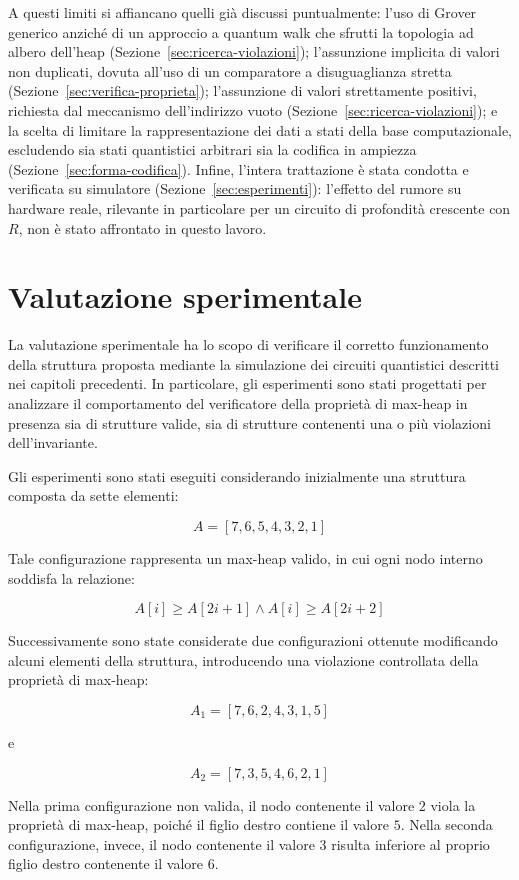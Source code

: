 A questi limiti si affiancano quelli già discussi puntualmente: l'uso di Grover generico anziché di un approccio a quantum walk che sfrutti la topologia ad albero dell'heap (Sezione~\ref{sec:ricerca-violazioni}); l'assunzione implicita di valori non duplicati, dovuta all'uso di un comparatore a disuguaglianza stretta (Sezione~\ref{sec:verifica-proprieta}); l'assunzione di valori strettamente positivi, richiesta dal meccanismo dell'indirizzo vuoto (Sezione~\ref{sec:ricerca-violazioni}); e la scelta di limitare la rappresentazione dei dati a stati della base computazionale, escludendo sia stati quantistici arbitrari sia la codifica in ampiezza (Sezione~\ref{sec:forma-codifica}). Infine, l'intera trattazione è stata condotta e verificata su simulatore (Sezione~\ref{sec:esperimenti}): l'effetto del rumore su hardware reale, rilevante in particolare per un circuito di profondità crescente con $R$, non è stato affrontato in questo lavoro.

\section{Valutazione sperimentale \label{sec:esperimenti}}

La valutazione sperimentale ha lo scopo di verificare il corretto funzionamento della struttura proposta mediante la simulazione dei circuiti quantistici descritti nei capitoli precedenti. In particolare, gli esperimenti sono stati progettati per analizzare il comportamento del verificatore della proprietà di max-heap in presenza sia di strutture valide, sia di strutture contenenti una o più violazioni dell'invariante.

Gli esperimenti sono stati eseguiti considerando inizialmente una struttura composta da sette elementi:

\[
  A = [7,6,5,4,3,2,1]
\]

Tale configurazione rappresenta un max-heap valido, in cui ogni nodo interno soddisfa la relazione:

\[
  A[i] \geq A[2i+1] \land A[i] \geq A[2i+2]
\]

Successivamente sono state considerate due configurazioni ottenute modificando alcuni elementi della struttura, introducendo una violazione controllata della proprietà di max-heap:

\[
  A_1 = [7,6,2,4,3,1,5]
\]

e

\[
  A_2 = [7,3,5,4,6,2,1]
\]

Nella prima configurazione non valida, il nodo contenente il valore $2$ viola la proprietà di max-heap, poiché il figlio destro contiene il valore $5$. Nella seconda configurazione, invece, il nodo contenente il valore $3$ risulta inferiore al proprio figlio destro contenente il valore $6$.

